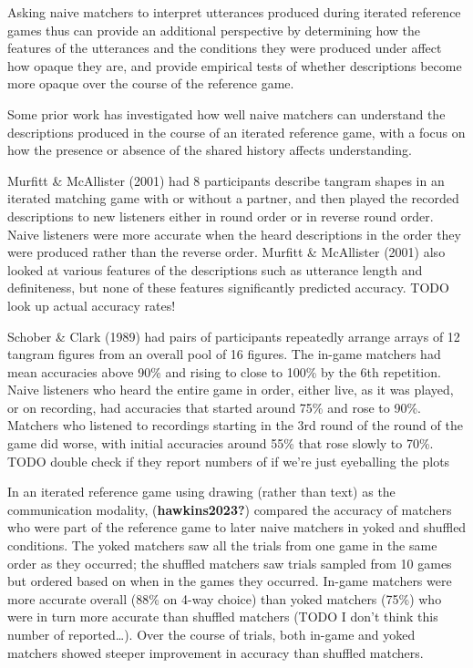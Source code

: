 \documentclass[10pt, letterpaper]{article}
\begin{document}
Asking naive matchers to interpret utterances produced during iterated
reference games thus can provide an additional perspective by
determining how the features of the utterances and the conditions they
were produced under affect how opaque they are, and provide empirical
tests of whether descriptions become more opaque over the course of the
reference game.

Some prior work has investigated how well naive matchers can understand
the descriptions produced in the course of an iterated reference game,
with a focus on how the presence or absence of the shared history
affects understanding.

Murfitt \& McAllister (2001) had 8 participants describe tangram shapes
in an iterated matching game with or without a partner, and then played
the recorded descriptions to new listeners either in round order or in
reverse round order. Naive listeners were more accurate when the heard
descriptions in the order they were produced rather than the reverse
order. Murfitt \& McAllister (2001) also looked at various features of
the descriptions such as utterance length and definiteness, but none of
these features significantly predicted accuracy. TODO look up actual
accuracy rates!

Schober \& Clark (1989) had pairs of participants repeatedly arrange
arrays of 12 tangram figures from an overall pool of 16 figures. The
in-game matchers had mean accuracies above 90\% and rising to close to
100\% by the 6th repetition. Naive listeners who heard the entire game
in order, either live, as it was played, or on recording, had accuracies
that started around 75\% and rose to 90\%. Matchers who listened to
recordings starting in the 3rd round of the round of the game did worse,
with initial accuracies around 55\% that rose slowly to 70\%. TODO
double check if they report numbers of if we're just eyeballing the
plots

In an iterated reference game using drawing (rather than text) as the
communication modality, (\textbf{hawkins2023?}) compared the accuracy of
matchers who were part of the reference game to later naive matchers in
yoked and shuffled conditions. The yoked matchers saw all the trials
from one game in the same order as they occurred; the shuffled matchers
saw trials sampled from 10 games but ordered based on when in the games
they occurred. In-game matchers were more accurate overall (88\% on
4-way choice) than yoked matchers (75\%) who were in turn more accurate
than shuffled matchers (TODO I don't think this number of
reported\ldots). Over the course of trials, both in-game and yoked
matchers showed steeper improvement in accuracy than shuffled matchers.
\end{document}
